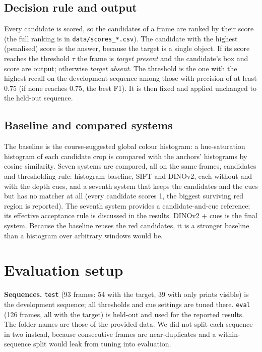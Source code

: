 \documentclass[11pt,a4paper]{article}
\begin{document}
\subsection{Decision rule and output}
Every candidate is scored, so the candidates of a frame are ranked by their score (the full ranking is in \texttt{data/scores\_*.csv}). The candidate with the highest (penalised) score is the answer, because the target is a single object. If its score reaches the threshold $\tau$ the frame is \emph{target present} and the
candidate's box and score are output; otherwise \emph{target absent}. The threshold is the one with the highest recall on the development sequence among those with precision of at least 0.75
(if none reaches 0.75, the best F1). It is then fixed and applied unchanged to the held-out sequence.

\subsection{Baseline and compared systems}
The baseline is the course-suggested global colour histogram: a hue-saturation histogram of each candidate crop is compared with the anchors' histograms by cosine similarity.
Seven systems are compared, all on the same frames, candidates and thresholding rule: histogram baseline, SIFT and DINOv2, each without and with the depth cues, and a seventh system that keeps the candidates and the cues but has no matcher at all (every candidate scores 1, the biggest surviving red region is reported). The seventh system provides a candidate-and-cue reference; its effective acceptance rule is discussed in the results. DINOv2 + cues is the final system.
Because the baseline reuses the red candidates, it is a stronger baseline than a histogram over arbitrary windows would be.

\FloatBarrier
\section{Evaluation setup}
\textbf{Sequences.} \texttt{test} (93 frames: 54 with the target, 39 with only prints visible) is the development sequence; all thresholds and cue settings are tuned there.
\texttt{eval} (126 frames, all with the target) is held-out and used for the reported results. The folder names are those of the provided data. We did not split each sequence in two instead, because consecutive frames are near-duplicates and a within-sequence split would leak from tuning into evaluation.
\end{document}
